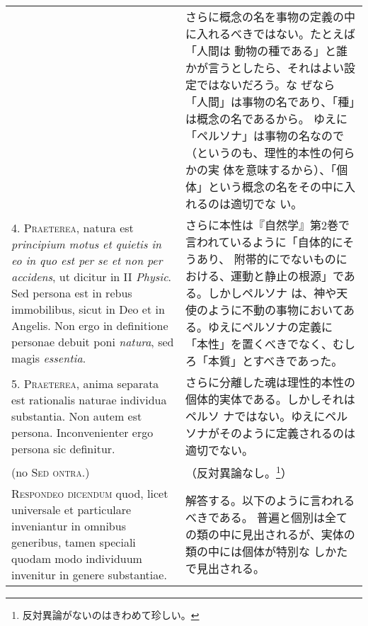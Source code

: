 \documentclass[10pt]{jsarticle} %
\begin{document}
\begin{longtable}{p{21em}p{21em}}
&

さらに概念の名を事物の定義の中に入れるべきではない。たとえば「人間は
 動物の種である」と誰かが言うとしたら、それはよい設定ではないだろう。な
 ぜなら「人間」は事物の名であり、「種」は概念の名であるから。
ゆえに「ペルソナ」は事物の名なので（というのも、理性的本性の何らかの実
 体を意味するから）、「個体」という概念の名をその中に入れるのは適切でな
 い。



\\



4. {\scshape Praeterea}, natura est {\itshape principium motus et quietis in eo in quo est per
se et non per accidens}, ut dicitur in II {\itshape Physic}. Sed persona est in
rebus immobilibus, sicut in Deo et in Angelis. Non ergo in definitione
personae debuit poni {\itshape natura}, sed magis {\itshape essentia}.


&

さらに本性は『自然学』第2巻で言われているように「自体的にそうあり、
 附帯的にでないものにおける、運動と静止の根源」である。しかしペルソナ
 は、神や天使のように不動の事物においてある。ゆえにペルソナの定義に
 「本性」を置くべきでなく、むしろ「本質」とすべきであった。


\\



5. {\scshape Praeterea}, anima separata est rationalis naturae individua
substantia. Non autem est persona. Inconvenienter ergo persona sic
definitur.


&

さらに分離した魂は理性的本性の個体的実体である。しかしそれはペルソ
 ナではない。ゆえにペルソナがそのように定義されるのは適切でない。



\\

(no {\scshape Sed ontra.})

&

（反対異論なし。\footnote{反対異論がないのはきわめて珍しい。}）

\\


{\scshape Respondeo dicendum} quod, licet universale et particulare inveniantur in
omnibus generibus, tamen speciali quodam modo individuum invenitur in
genere substantiae. 


&

解答する。以下のように言われるべきである。
普遍と個別は全ての類の中に見出されるが、実体の類の中には個体が特別な
 しかたで見出される。



\end{longtable}
\end{document}
